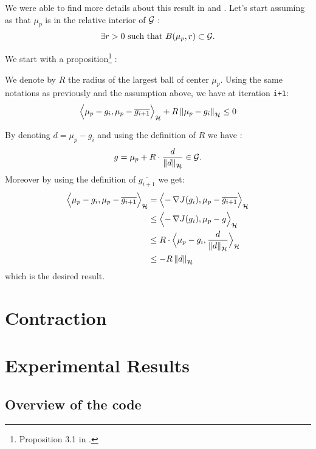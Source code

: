   We were able to find more details about this result in \cite{Beck} and \cite{Chen}.
Let's start assuming as \cite{Bach} that $\mu_p$ is in the relative interior
of $\mathcal{G}$ :
\begin{equation}
\exists r>0 \text{ such that } B(\mu_p, r) \subset \mathcal{G}.
\end{equation}



We start with a proposition\footnote{Proposition 3.1 in \cite{Beck}.} :
\begin{boxtheorem}
  We denote by $R$ the radius of the largest ball of center $\mu_p$.
  Using the same notations as previously and the assumption above, we have at
  iteration \texttt{i+1}:
  \begin{equation}
    \Bigps{\mu_p-g_{i}}{\mu_p-\overline{g_{i+1}}}+R \norme{\mu_p-g_{i}} \leq 0
  \end{equation}
\end{boxtheorem}

\begin{boxcomputation}
  By denoting $d = \mu_p-g_i$ and using the definition of $R$ we have :
\begin{equation*}
  g = \mu_p+R\cdot \frac{d}{\norme{d}} \in \G.
\end{equation*}
Moreover by using the definition of $\overline{g_{i+1}}$ we get:
  \begin{align*}
\Bigps{\mu_p-g_{i}}{\mu_p-\overline{g_{i+1}}} &=
\Bigps{-\grad{J(g_i)}}{\mu_p-\overline{g_{i+1}}}\\&\leq
\Bigps{-\grad{J(g_i)}}{\mu_p-g}\\
&\leq R\cdot\Bigps{\mu_p-g_{i}}{\frac{d}{\norme{d}}}\\
&\leq -R \norme{d}
  \end{align*}
  which is the desired result.
\end{boxcomputation}




\section{Contraction}
\label{sec:contraction}


\section{Experimental Results}
\label{sec:ER}

\subsection{Overview of the code}

